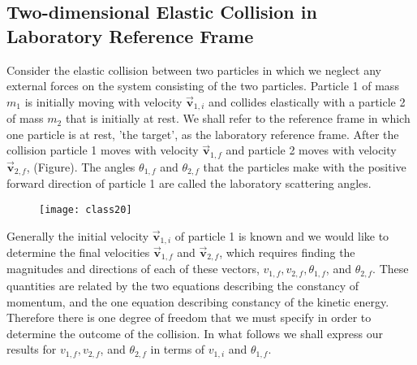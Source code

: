 \subsection{ Two-dimensional Elastic Collision in Laboratory Reference Frame}
Consider the elastic collision between two particles in which we neglect any external forces on the system consisting of the two particles. Particle 1 of mass $m_{1}$ is initially moving with velocity $\overrightarrow{\mathbf{v}}_{1, i}$ and collides elastically with a particle 2 of mass $m_{2}$ that is initially at rest. We shall refer to the reference frame in which one particle is at rest, 'the target', as the laboratory reference frame. After the collision particle 1 moves with velocity $\overrightarrow{\mathbf{v}}_{1, f}$ and particle 2 moves with velocity $\overrightarrow{\mathbf{v}}_{2, f}$, (Figure). The angles $\theta_{1, f}$ and $\theta_{2, f}$ that the particles make with the positive forward direction of particle 1 are called the laboratory scattering angles.\\
\begin{figure}[H]
	\centering
	\texttt{[image: class20]}
	\caption{}
	\label{}
\end{figure}
Generally the initial velocity $\overrightarrow{\mathbf{v}}_{1, i}$ of particle 1 is known and we would like to determine the final velocities $\overrightarrow{\mathbf{v}}_{1, f}$ and $\overrightarrow{\mathbf{v}}_{2, f}$, which requires finding the magnitudes and directions of each of these vectors, $v_{1, f}, v_{2, f}, \theta_{1, f}$, and $\theta_{2, f} .$ These quantities are related by the two equations describing the constancy of momentum, and the one equation describing constancy of the kinetic energy. Therefore there is one degree of freedom that we must specify in order to determine the outcome of the collision. In what follows we shall express our results for $v_{1, f}, v_{2, f}$, and $\theta_{2, f}$ in terms of $v_{1, i}$ and $\theta_{1, f}$.\\
